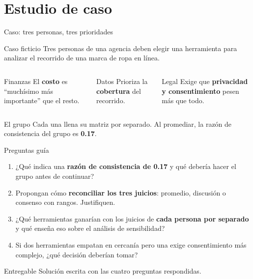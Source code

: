 \documentclass[aspectratio=169,xcolor=dvipsnames]{beamer}
\begin{document}
\section[Caso]{Estudio de caso}

\begin{frame}{Caso: tres personas, tres prioridades}
\begin{exampleblock}{Caso ficticio}
  Tres personas de una agencia deben elegir una herramienta para analizar el recorrido de una marca de ropa en línea.
\end{exampleblock}
\begin{columns}[T]
  \begin{block}{Finanzas}
    \small El \textbf{costo} es \enquote{muchísimo más importante} que el resto.
  \end{block}
  \begin{block}{Datos}
    \small Prioriza la \textbf{cobertura} del recorrido.
  \end{block}
  \begin{block}{Legal}
    \small Exige que \textbf{privacidad y consentimiento} pesen más que todo.
  \end{block}
\end{columns}
\vspace{4pt}
\begin{alertblock}{El grupo}
  \small Cada una llena su matriz por separado. Al promediar, la razón de consistencia del grupo es \textbf{0.17}.
\end{alertblock}
\end{frame}

\begin{frame}{Preguntas guía}
\small
\begin{enumerate}
  \item ¿Qué indica una \textbf{razón de consistencia de 0.17} y qué debería hacer el grupo antes de continuar?
  \vspace{3pt}
  \item Propongan cómo \textbf{reconciliar los tres juicios}: promedio, discusión o consenso con rangos. Justifiquen.
  \vspace{3pt}
  \item ¿Qué herramientas ganarían con los juicios de \textbf{cada persona por separado} y qué enseña eso sobre el análisis de sensibilidad?
  \vspace{3pt}
  \item Si dos herramientas empatan en cercanía pero una exige consentimiento más complejo, ¿qué decisión deberían tomar?
\end{enumerate}
\begin{alertblock}{Entregable}
  \small Solución escrita con las cuatro preguntas respondidas.
\end{alertblock}
\end{frame}
\end{document}
